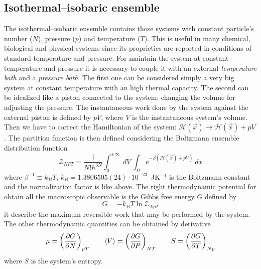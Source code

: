\subsection{Isothermal--isobaric ensemble}
The isothermal--isobaric ensemble contains those systems with constant particle's number ($N$), pressure ($p$) and temperature ($T$). This is useful in many chemical, biological and physical systems since its proprieties are reported in conditions of standard temperature and pressure. For maintain the system at constant temperature and pressure it is necessary to couple it with an external \textit{temperature bath} and a \textit{pressure bath}. The first one can be considered simply a very big system at constant temperature with an high thermal capacity. The second can be idealized like a piston connected to the system: changing the volume for adjusting the pressure. The instantaneous work done by the system against the external piston is defined by $pV$, where $V$ is the instantaneous system's volume. Then we have to correct the Hamiltonian of the system: $\mathcal{H}(\vec x) \rightarrow \mathcal{H}(\vec x) + pV$. The partition function is then defined considering the Boltzmann ensemble distribution function
\begin{equation}
	\mathcal{Z}_{NPT} = \frac{1}{N!h^{3N}}\int_0^{+\infty}\ dV \ \int_\Omega e^{-\beta(\mathcal{H}(\vec x) + pV)}\ dx
\end{equation}
where $\beta^{-1} \equiv k_B T$, $k_B = 1.3806505(24) \cdot 10^{-23}$~JK$^{-1}$ is the Boltzmann constant and the normalization factor is like above. The right thermodynamic potential for obtain all the macroscopic observable is the Gibbs free energy $G$ defined by
\begin{equation}
	G = -k_B T\ln \mathcal{Z}_{NpT}
\end{equation}
it describe the maximum reversible work that may be performed by the system. The other thermodynamic quantities can be obtained by derivative
\begin{equation}
	\mu = \left ( \frac{\partial G}{\partial N}\right )_{pT} \qquad \langle V \rangle = \left ( \frac{\partial G}{\partial P}\right )_{NT} \qquad S = \left ( \frac{\partial G}{\partial T}\right )_{Np}
\end{equation}
where $S$ is the system's entropy.


